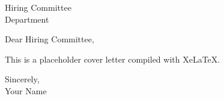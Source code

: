 \documentclass[11pt]{letter}
\begin{document}
\begin{letter}{Hiring Committee\\Department}
\opening{Dear Hiring Committee,}
This is a placeholder cover letter compiled with XeLaTeX.
\closing{Sincerely,\\Your Name}
\end{letter}
\end{document}
